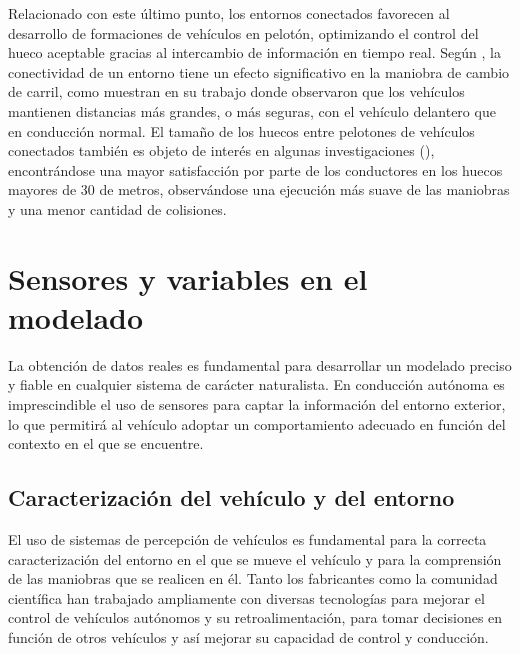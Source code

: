 Relacionado con este último punto, los entornos conectados favorecen al desarrollo de formaciones de vehículos en pelotón, optimizando el control del hueco aceptable gracias al intercambio de información en tiempo real. Según \textcite{ali18}, la conectividad de un entorno tiene un efecto significativo en la maniobra de cambio de carril, como muestran en su trabajo donde observaron que los vehículos mantienen distancias más grandes, o más seguras, con el vehículo delantero que en conducción normal. El tamaño de los huecos entre pelotones de vehículos conectados también es objeto de interés en algunas investigaciones (\cite{aramrattana}), encontrándose una mayor satisfacción por parte de los conductores en los huecos mayores de 30 de metros, observándose una ejecución más suave de las maniobras y una menor cantidad de colisiones.

\section{Sensores y variables en el modelado}

La obtención de datos reales es fundamental para desarrollar un modelado preciso y fiable en cualquier sistema de carácter naturalista. En conducción autónoma es imprescindible el uso de sensores para captar la información del entorno exterior, lo que permitirá al vehículo adoptar un comportamiento adecuado en función del contexto en el que se encuentre.

\subsection{Caracterización del vehículo y del entorno}

El uso de sistemas de percepción de vehículos es fundamental para la correcta caracterización del entorno en el que se mueve el vehículo y para la comprensión de las maniobras que se realicen en él. Tanto los fabricantes como la comunidad científica han trabajado ampliamente con diversas tecnologías para mejorar el control de vehículos autónomos y su retroalimentación, para tomar decisiones en función de otros vehículos y así mejorar su capacidad de control y conducción. 

